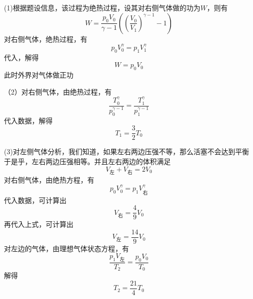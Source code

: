 \documentclass[lang=cn,10pt]{elegantbook}
\begin{document}
	\begin{solution}
		
		(1)根据题设信息，该过程为绝热过程，设其对右侧气体做的功为$W$，则有
		\begin{equation*}
			W=\frac{p_0V_0}{\gamma -1}((\frac{V_0}{V_1})^{\gamma -1}-1)
		\end{equation*}
		对右侧气体，绝热过程，有
		\begin{equation*}
				p_{0}V_{0}^{\gamma}=p_{1}V_{1}^{\gamma}
		\end{equation*}
		代入，解得
		\begin{equation*}
			W=p_{0}V_{0}
		\end{equation*}
		此时外界对气体做正功
		
		（2）对右侧气体，由绝热过程，有
		\begin{equation*}
			\frac{T_{0}^{\gamma}}{p_{0}^{\gamma -1}}=\frac{T_{1}^{\gamma}}{p_{1}^{\gamma -1}}
		\end{equation*}
		代入数据，解得
		\begin{equation*}
			T_{1}=\frac{3}{2}T_{0}
		\end{equation*}
		
		(3)对左侧气体分析，我们知道，如果左右两边压强不等，那么活塞不会达到平衡
		于是乎，左右两边压强相等。并且左右两边的体积满足
		\begin{equation*}
			V_{\text{左}}+V_{\text{右}}=2V_{0}
		\end{equation*}
		对右侧气体，由绝热方程，有
		\begin{equation*}
			p_{0}V_{0}^{\gamma}=p_{1}V_{\text{右}}^{\gamma}
		\end{equation*}
		代入数据，可计算出
		\begin{equation*}
			V_{\text{右}}=\frac{4}{9}V_{0}
		\end{equation*}
		再代入上式，可计算出
		\begin{equation*}
				V_{\text{左}}=\frac{14}{9}V_{0}
		\end{equation*}
		对左边的气体，由理想气体状态方程，有
		\begin{equation*}
			\frac{p_1V_{\text{左}}}{T_2}=\frac{p_0V_0}{T_0}
		\end{equation*}
		解得
		\begin{equation*}
			T_{2}=\frac{21}{4}T_{0}
		\end{equation*}
		

\end{solution}
\end{document}
